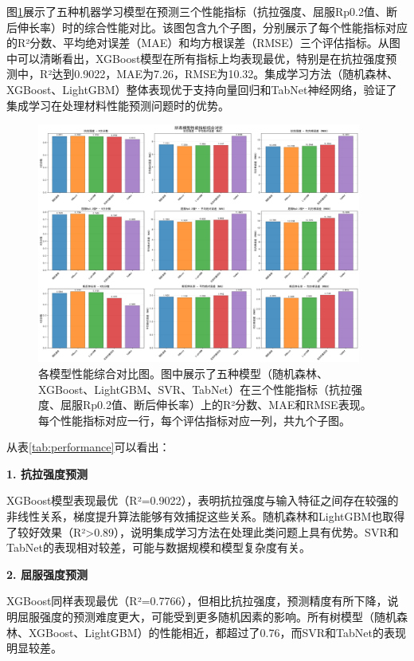 \documentclass[12pt,a4paper]{article}
\begin{document}
图\ref{fig:model_comparison}展示了五种机器学习模型在预测三个性能指标（抗拉强度、屈服Rp0.2值、断后伸长率）时的综合性能对比。该图包含九个子图，分别展示了每个性能指标对应的R²分数、平均绝对误差（MAE）和均方根误差（RMSE）三个评估指标。从图中可以清晰看出，XGBoost模型在所有指标上均表现最优，特别是在抗拉强度预测中，R²达到0.9022，MAE为7.26，RMSE为10.32。集成学习方法（随机森林、XGBoost、LightGBM）整体表现优于支持向量回归和TabNet神经网络，验证了集成学习在处理材料性能预测问题时的优势。

\begin{figure}[H]
\centering
\includegraphics[width=0.95\textwidth]{fig/01_comprehensive_model_performance_comparison.png}
\caption{各模型性能综合对比图。图中展示了五种模型（随机森林、XGBoost、LightGBM、SVR、TabNet）在三个性能指标（抗拉强度、屈服Rp0.2值、断后伸长率）上的R²分数、MAE和RMSE表现。每个性能指标对应一行，每个评估指标对应一列，共九个子图。}
\label{fig:model_comparison}
\end{figure}

从表\ref{tab:performance}可以看出：

\textbf{1. 抗拉强度预测}

XGBoost模型表现最优（R²=0.9022），表明抗拉强度与输入特征之间存在较强的非线性关系，梯度提升算法能够有效捕捉这些关系。随机森林和LightGBM也取得了较好效果（R²>0.89），说明集成学习方法在处理此类问题上具有优势。SVR和TabNet的表现相对较差，可能与数据规模和模型复杂度有关。

\textbf{2. 屈服强度预测}

XGBoost同样表现最优（R²=0.7766），但相比抗拉强度，预测精度有所下降，说明屈服强度的预测难度更大，可能受到更多随机因素的影响。所有树模型（随机森林、XGBoost、LightGBM）的性能相近，都超过了0.76，而SVR和TabNet的表现明显较差。
\end{document}
